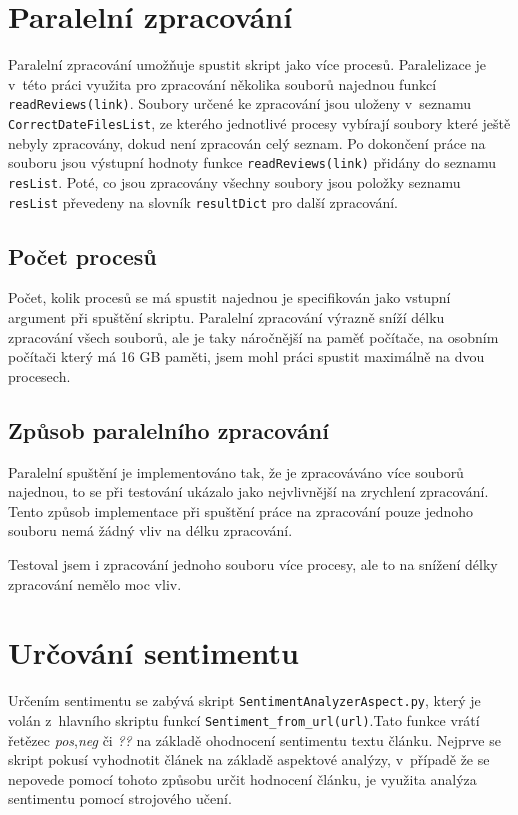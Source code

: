 \section{Paralelní zpracování}

Paralelní zpracování umožňuje spustit skript jako více procesů. Paralelizace je v~této práci využita pro zpracování několika souborů najednou funkcí \verb|readReviews(link)|. Soubory určené ke zpracování jsou uloženy v~seznamu \verb|CorrectDateFilesList|, ze kterého jednotlivé procesy vybírají soubory které ještě nebyly zpracovány, dokud není zpracován celý seznam. Po dokončení práce na souboru jsou výstupní hodnoty funkce \verb|readReviews(link)| přidány do seznamu \verb|resList|. Poté, co jsou zpracovány všechny soubory jsou položky seznamu \verb|resList| převedeny na slovník \verb|resultDict| pro další zpracování.

\subsection*{Počet procesů}
Počet, kolik procesů se má spustit najednou je specifikován jako vstupní argument při spuštění skriptu. Paralelní zpracování výrazně sníží délku zpracování všech souborů, ale je taky náročnější na paměť počítače, na osobním počítači který má 16 GB paměti, jsem mohl práci spustit maximálně na dvou procesech. 

\subsection*{Způsob paralelního zpracování}
Paralelní spuštění je implementováno tak, že je zpracováváno více souborů najednou, to se při testování ukázalo jako nejvlivnější na zrychlení zpracování. Tento způsob implementace při spuštění práce na zpracování pouze jednoho souboru nemá žádný vliv na délku zpracování.

Testoval jsem i zpracování jednoho souboru více procesy, ale to na snížení délky zpracování nemělo moc vliv.

\section{Určování sentimentu}

Určením sentimentu se zabývá skript \verb|SentimentAnalyzerAspect.py|, který je volán z~hlavního skriptu funkcí \verb|Sentiment_from_url(url)|.Tato funkce vrátí řetězec \textit{pos},\textit{neg} či \textit{??} na základě ohodnocení sentimentu textu článku. Nejprve se skript pokusí vyhodnotit článek na základě aspektové analýzy, v~případě že se nepovede pomocí tohoto způsobu určit hodnocení článku, je využita analýza sentimentu pomocí strojového učení.

